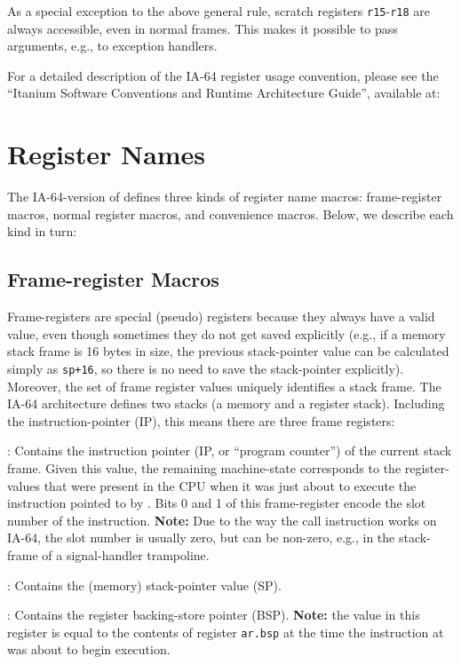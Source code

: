 \documentclass{article}
\begin{document}
As a special exception to the above general rule, scratch registers
\texttt{r15}-\texttt{r18} are always accessible, even in normal
frames.  This makes it possible to pass arguments, e.g., to exception
handlers.

For a detailed description of the IA-64 register usage convention,
please see the ``Itanium Software Conventions and Runtime Architecture
Guide'', available at:
\begin{center}
\end{center}


\section{Register Names}

The IA-64-version of  defines three kinds of register
name macros: frame-register macros, normal register macros, and
convenience macros.  Below, we describe each kind in turn:


\subsection{Frame-register Macros}

Frame-registers are special (pseudo) registers because they always
have a valid value, even though sometimes they do not get saved
explicitly (e.g., if a memory stack frame is 16 bytes in size, the
previous stack-pointer value can be calculated simply as
\texttt{sp+16}, so there is no need to save the stack-pointer
explicitly).  Moreover, the set of frame register values uniquely
identifies a stack frame.  The IA-64 architecture defines two stacks
(a memory and a register stack). Including the instruction-pointer
(IP), this means there are three frame registers:
\begin{Description}
\item[\Const{UNW\_IA64\_IP}:] Contains the instruction pointer (IP, or
  ``program counter'') of the current stack frame.  Given this value,
  the remaining machine-state corresponds to the register-values that
  were present in the CPU when it was just about to execute the
  instruction pointed to by .  Bits 0 and 1 of
  this frame-register encode the slot number of the instruction.
  \textbf{Note:} Due to the way the call instruction works on IA-64,
  the slot number is usually zero, but can be non-zero, e.g., in the
  stack-frame of a signal-handler trampoline.
\item[\Const{UNW\_IA64\_SP}:] Contains the (memory) stack-pointer
  value (SP).
\item[\Const{UNW\_IA64\_BSP}:] Contains the register backing-store
  pointer (BSP).  \textbf{Note:} the value in this register is equal
  to the contents of register \texttt{ar.bsp} at the time the
  instruction at  was about to begin execution.
\end{Description}
\end{document}
